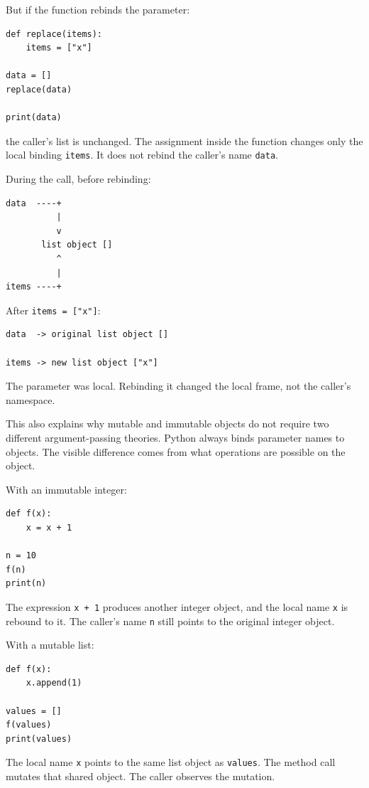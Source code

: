 But if the function rebinds the parameter:

\begin{verbatim}
def replace(items):
    items = ["x"]

data = []
replace(data)

print(data)
\end{verbatim}

the caller's list is unchanged. The assignment inside the function changes only the local binding \texttt{items}. It does not rebind the caller's name \texttt{data}.

During the call, before rebinding:

\begin{verbatim}
data  ----+
          |
          v
       list object []
          ^
          |
items ----+
\end{verbatim}

After \texttt{items = ["x"]}:

\begin{verbatim}
data  -> original list object []

items -> new list object ["x"]
\end{verbatim}

The parameter was local. Rebinding it changed the local frame, not the caller's namespace.

This also explains why mutable and immutable objects do not require two different argument-passing theories. Python always binds parameter names to objects. The visible difference comes from what operations are possible on the object.

With an immutable integer:

\begin{verbatim}
def f(x):
    x = x + 1

n = 10
f(n)
print(n)
\end{verbatim}

The expression \texttt{x + 1} produces another integer object, and the local name \texttt{x} is rebound to it. The caller's name \texttt{n} still points to the original integer object.

With a mutable list:

\begin{verbatim}
def f(x):
    x.append(1)

values = []
f(values)
print(values)
\end{verbatim}

The local name \texttt{x} points to the same list object as \texttt{values}. The method call mutates that shared object. The caller observes the mutation.

